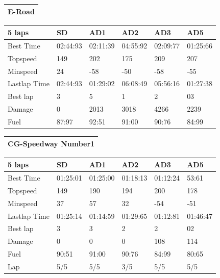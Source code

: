 \documentclass{llncs}
\begin{document}
\begin{table}[h!]
	\begin{tabular}{ |p{15.2cm}|}
		\hline
		\textbf{E-Road}   
		\\
		\hline
	\end{tabular}
	\begin{tabular}{ |p{3cm}|p{2cm}|p{2cm}|p{2 cm}|p{2 cm}|p{2 cm}|}
		\hline
		{ \color{blue}\textbf{5 laps} }&
		{ \color{red}\textbf{SD}}&  
		{ \color{red} \textbf{AD1} } &
		{ \color{red} \textbf{AD2} } &
		{ \color{red} \textbf{AD3} } &
		{ \color{red} \textbf{AD5} }
		\\
		\hline
		Best Time & 02:44:93  & 02:11:39 & 04:55:92 & 02:09:77 & 01:25:66 
		\\
		\hline
		Topspeed & 149  & 202 & 175 & 209& 207 
		\\
		\hline
		Minspeed & 24  & -58 & -50 & -58 & -55 
		\\
		\hline 
		
		Lastlap Time  & 02:44:93 & 01:29:02 & 06:08:49 &  05:56:16  & 01:27:38 
		\\
		\hline 
		Best lap & 3 & 5 & 1& 2 & 03
		\\
		\hline
		Damage & 0 & 2013 & 3018 &  4266& 2239 
		\\
		\hline 
		Fuel & 87:97 & 92:51 & 91:00 &90:76 & 84:99 
		\\
		\hline  
		
	\end{tabular}
	
	
	\begin{tabular}{ |p{15.2cm}|}
		\hline
		\textbf{CG-Speedway Number1}   
		\\
		\hline
	\end{tabular}
	\begin{tabular}{ |p{3cm}|p{2cm}|p{2cm}|p{2 cm}|p{2 cm}|p{2 cm}|}
		\hline
		{ \color{blue}\textbf{5 laps} }&
		{ \color{red}\textbf{SD}}&  
		{ \color{red} \textbf{AD1} } &
		{ \color{red} \textbf{AD2} } &
		{ \color{red} \textbf{AD3} } &
		{ \color{red} \textbf{AD5} }
		\\
		\hline
		Best Time & 01:25:01  & 01:25:00 & 01:18:13& 01:12:24 & 53:61 
		\\
		\hline
		Topspeed & 149  & 190 & 194 & 200 & 178 
		\\
		\hline
		Minspeed & 37 & 57 & 32 & -54 & -51 
		\\
		\hline 
		
		Lastlap	Time  & 01:25:14 & 01:14:59 & 01:29:65 & 01:12:81& 01:46:47 
		\\
		\hline 
		Best lap & 3 & 3 & 2 & 2 & 02  
		\\
		\hline
		Damage & 0 & 0 & 0 & 108 & 114 
		\\
		\hline 
		Fuel & 90:51 & 91:00 & 90:76 & 84:99 & 80:65 
		\\
		\hline 
		Lap & 5/5 & 5/5& 3/5 & 5/5 & 5/5
		\\
		\hline
	\end{tabular} 
\end{table}
\end{document}
